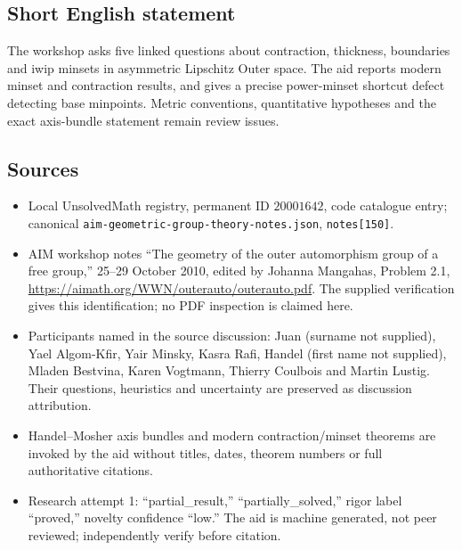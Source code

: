 \documentclass[11pt]{article}
\begin{document}
\subsection{Short English statement}
The workshop asks five linked questions about contraction, thickness, boundaries and iwip minsets in asymmetric Lipschitz Outer space. The aid reports modern minset and contraction results, and gives a precise power-minset shortcut defect detecting base minpoints. Metric conventions, quantitative hypotheses and the exact axis-bundle statement remain review issues.
\subsection{Sources}
\begin{itemize}
\item Local UnsolvedMath registry, permanent ID \(20001642\), code catalogue entry; canonical \texttt{aim-geometric-group-theory-notes.json}, \texttt{notes[150]}.
\item AIM workshop notes ``The geometry of the outer automorphism group of a free group,'' 25--29 October 2010, edited by Johanna Mangahas, Problem 2.1, \url{https://aimath.org/WWN/outerauto/outerauto.pdf}. The supplied verification gives this identification; no PDF inspection is claimed here.
\item Participants named in the source discussion: Juan (surname not supplied), Yael Algom-Kfir, Yair Minsky, Kasra Rafi, Handel (first name not supplied), Mladen Bestvina, Karen Vogtmann, Thierry Coulbois and Martin Lustig. Their questions, heuristics and uncertainty are preserved as discussion attribution.
\item Handel--Mosher axis bundles and modern contraction/minset theorems are invoked by the aid without titles, dates, theorem numbers or full authoritative citations.
\item Research attempt 1: ``partial\_result,'' ``partially\_solved,'' rigor label ``proved,'' novelty confidence ``low.'' The aid is machine generated, not peer reviewed; independently verify before citation.
\end{itemize}
\end{document}
